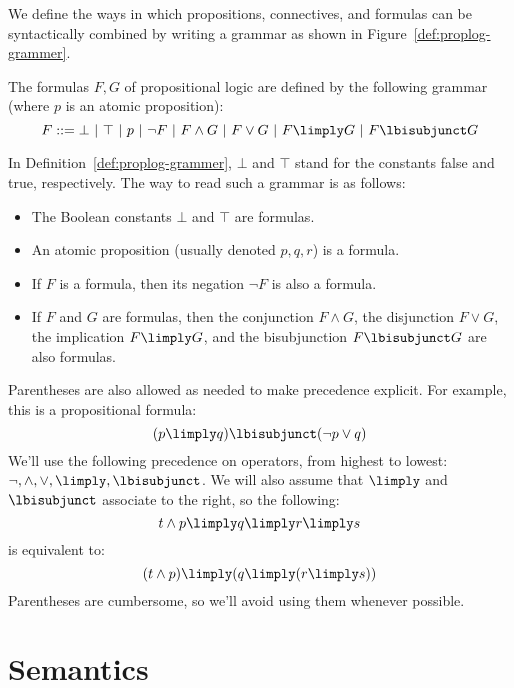 \documentclass[11pt,twoside]{scrartcl}
\newcommand{\bebecomes}{\mathrel{::=}}
\newcommand{\alternative}{~|~}
\begin{document}
We define the ways in which propositions, connectives, and formulas can be syntactically combined by writing a grammar as shown in Figure~\ref{def:proplog-grammer}.

\begin{definition}
\label{def:proplog-grammer}
  The formulas $F,G$ of propositional logic are defined by the following grammar (where $p$ is an atomic proposition):
  \[
  F \bebecomes \bot \alternative \top \alternative p \alternative \lnot F \alternative F\land G \alternative F\lor G \alternative F\limply G \alternative F \lbisubjunct G
  \]
\end{definition}
In Definition~\ref{def:proplog-grammer}, $\bot$ and $\top$ stand for the constants false and true, respectively. 
The way to read such a grammar is as follows:
\begin{itemize} 
  \item The Boolean constants $\bot$ and $\top$ are formulas.
  \item An atomic proposition (usually denoted $p,q,r$) is a formula.
  \item If $F$ is a formula, then its negation $\lnot F$ is also a formula.
  \item If $F$ and $G$ are formulas, then the conjunction $F\land G$, the disjunction $F\lor G$, the implication $F \limply G$, and the bisubjunction $F\lbisubjunct G$ are also formulas.
\end{itemize}
Parentheses are also allowed as needed to make precedence explicit. For example, this is a propositional formula:
\begin{equation}
(p \limply q) \lbisubjunct (\lnot p \lor q)
\label{eq:ex1}
\end{equation}
We'll use the following precedence on operators, from highest to lowest: $\lnot, \land, \lor, \limply, \lbisubjunct$. We will also assume that $\limply$ and $\lbisubjunct$ associate to the right, so the following:
\begin{equation}
t \land p \limply q \limply r \limply s
\end{equation}
is equivalent to:
\begin{equation}
(t \land p) \limply (q \limply (r \limply s))
\end{equation}
Parentheses are cumbersome, so we'll avoid using them whenever possible.


\section{Semantics}
\end{document}
